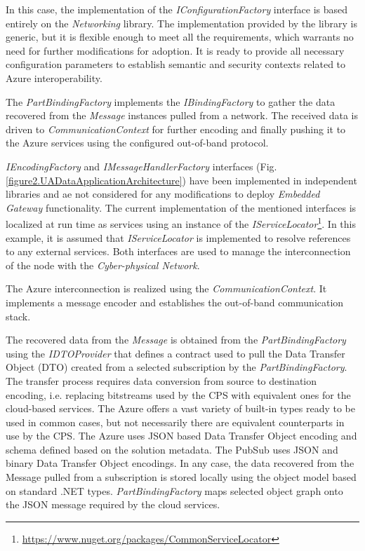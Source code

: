 \documentclass{article}
\begin{document}
In this case, the implementation of the \emph{IConfigurationFactory} interface is based entirely on the \emph{Networking} library. The implementation provided by the library is generic, but it is flexible enough to meet all the requirements, which warrants no need for further modifications for adoption. It is ready to provide all necessary configuration parameters to establish semantic and security contexts related to Azure interoperability.

The \emph{PartBindingFactory} implements the \emph{IBindingFactory} to gather the data recovered from the \emph{Message} instances pulled from a network. The received data is driven to \emph{CommunicationContext} for further encoding and finally pushing it to the Azure services using the configured out-of-band protocol.

\emph{IEncodingFactory} and \emph{IMessageHandlerFactory} interfaces (Fig. \ref{figure2.UADataApplicationArchitecture}) have been implemented in independent libraries and ae not considered for any modifications to deploy \emph{Embedded Gateway} functionality. The current implementation of the mentioned interfaces is localized at run time as services using an instance of the \emph{IServiceLocator}\footnote{ \url{https://www.nuget.org/packages/CommonServiceLocator} }. In this example, it is assumed that \emph{IServiceLocator} is implemented to resolve references to any external services. Both interfaces are used to manage the interconnection of the node with the \emph{Cyber-physical Network}.

The Azure interconnection is realized using the \emph{CommunicationContext}. It implements a message encoder and establishes the out-of-band communication stack.

The recovered data from the \emph{Message} is obtained from the \emph{PartBindingFactory} using the \emph{IDTOProvider} that defines a contract used to pull the Data Transfer Object (DTO) created from a selected subscription by the \emph{PartBindingFactory}. The transfer process requires data conversion from source to destination encoding, i.e. replacing bitstreams used by the CPS with equivalent ones for the cloud-based services. The Azure offers a vast variety of built-in types ready to be used in common cases, but not necessarily there are equivalent counterparts in use by the CPS. The Azure uses JSON based Data Transfer Object encoding and schema defined based on the solution metadata. The PubSub uses JSON and binary Data Transfer Object encodings. In any case, the data recovered from the Message pulled from a subscription is stored locally using the object model based on standard .NET types. \emph{PartBindingFactory} maps selected object graph onto the JSON message required by the cloud services.
\end{document}
